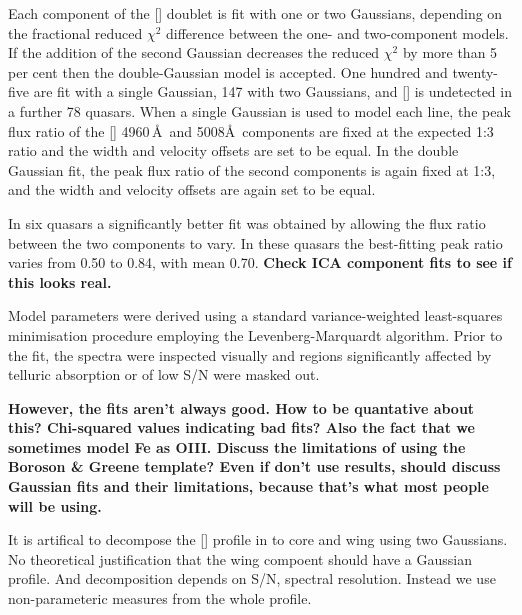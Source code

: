 Each component of the [] doublet is fit with one or two Gaussians, depending on the fractional reduced $\chi^2$ difference between the one- and two-component models. 
If the addition of the second Gaussian decreases the reduced $\chi^2$ by more than 5 per cent then the double-Gaussian model is accepted.
One hundred and twenty-five are fit with a single Gaussian, 147 with two Gaussians, and [] is undetected in a further 78 quasars.
When a single Gaussian is used to model each line, the peak flux ratio of the [] 4960\,\AA\, and 5008\AA\, components are fixed at the expected 1:3 ratio and the width and velocity offsets are set to be equal.
In the double Gaussian fit, the peak flux ratio of the second components is again fixed at 1:3, and the width and velocity offsets are again set to be equal. 

In six quasars a significantly better fit was obtained by allowing the flux ratio between the two components to vary.
In these quasars the best-fitting peak ratio varies from 0.50 to 0.84, with mean 0.70.
{\bf Check ICA component fits to see if this looks real.}

Model parameters were derived using a standard variance-weighted least-squares minimisation procedure employing the Levenberg-Marquardt algorithm. 
Prior to the fit, the spectra were inspected visually and regions significantly affected by telluric absorption or of low S/N were masked out.

{\bf However, the fits aren't always good. How to be quantative about this? Chi-squared values indicating bad fits? Also the fact that we sometimes model Fe as OIII. Discuss the limitations of using the Boroson \& Greene template? Even if don't use results, should discuss Gaussian fits and their limitations, because that's what most people will be using.}



It is artifical to decompose the [] profile in to core and wing using two Gaussians. 
No theoretical justification that the wing compoent should have a Gaussian profile. 
And decomposition depends on S/N, spectral resolution. 
Instead we use non-parameteric measures from the whole profile. 

